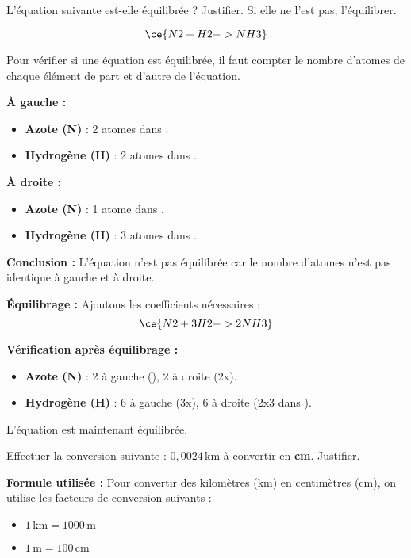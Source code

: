 \documentclass[answers]{exam}
\begin{document}
\begin{questions}
  \question[2] L'équation suivante est-elle équilibrée ? Justifier. Si elle ne l'est pas, l'équilibrer.
  
  \[
  \ce{N2 + H2 -> NH3}
  \]

  \begin{solution}
    Pour vérifier si une équation est équilibrée, il faut compter le nombre d'atomes de chaque élément de part et d'autre de l'équation.

    \textbf{À gauche :}
    \begin{itemize}
      \item \textbf{Azote (N)} : 2 atomes dans .
      \item \textbf{Hydrogène (H)} : 2 atomes dans .
    \end{itemize}

    \textbf{À droite :}
    \begin{itemize}
      \item \textbf{Azote (N)} : 1 atome dans .
      \item \textbf{Hydrogène (H)} : 3 atomes dans .
    \end{itemize}

    \textbf{Conclusion :} L'équation n'est pas équilibrée car le nombre d'atomes n'est pas identique à gauche et à droite.

    \textbf{Équilibrage :}
    Ajoutons les coefficients nécessaires :
    \[
    \ce{N2 + 3 H2 -> 2 NH3}
    \]

    \textbf{Vérification après équilibrage :}
    \begin{itemize}
      \item \textbf{Azote (N)} : 2 à gauche (), 2 à droite (2x).
      \item \textbf{Hydrogène (H)} : 6 à gauche (3x), 6 à droite (2x3 dans ).
    \end{itemize}

    L'équation est maintenant équilibrée.
  \end{solution}
  
  \question[1] Effectuer la conversion suivante : \( 0,0024 \, \mathrm{km} \) à convertir en \textbf{cm}. Justifier.
  \begin{solution}
    \textbf{Formule utilisée :} Pour convertir des kilomètres (km) en centimètres (cm), on utilise les facteurs de conversion suivants :
    \begin{itemize}
      \item \( 1 \, \mathrm{km} = 1000 \, \mathrm{m} \)
      \item \( 1 \, \mathrm{m} = 100 \, \mathrm{cm} \)
    \end{itemize}


\end{solution}
\end{questions}
\end{document}
